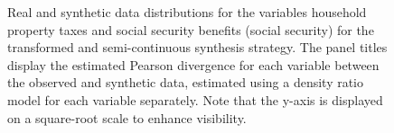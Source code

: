 \documentclass[
]{article}
\begin{document}
\begin{figure}[t]


\caption{\label{fig-application-distributions}Real and synthetic data
distributions for the variables household property taxes and social
security benefits (social security) for the transformed and
semi-continuous synthesis strategy. The panel titles display the
estimated Pearson divergence for each variable between the observed and
synthetic data, estimated using a density ratio model for each variable
separately. Note that the y-axis is displayed on a square-root scale to
enhance visibility.}

\end{figure}%

\linespread{2}
\end{document}
